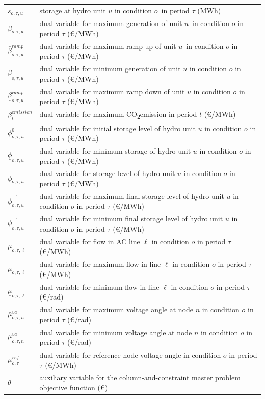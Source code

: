 \documentclass[final]{IEEEtran}
\newcommand{\COtwo}{CO\textsubscript{2}\;}
\begin{document}
\begin{supertabular}{p{1.5cm} p{6.5cm}}
	$s_{o, \tau, u}$ 						& storage at hydro unit $u$ in condition $o$ in period $\tau$ (MWh) \\
	$\bar{\beta}_{o, \tau, u}$ & dual variable for maximum generation of unit $u$ in condition $o$ in period $\tau$ (€/MWh) \\
	$\bar{\beta}_{o, \tau, u}^{ramp}$ & dual variable for maximum ramp up of unit $u$ in condition $o$ in period $\tau$ (€/MWh) \\
	$\underline{\beta}_{o, \tau, u}$ & dual variable for minimum generation of unit $u$ in condition $o$ in period $\tau$ (€/MWh) \\
	$\underline{\beta}_{o, \tau, u}^{ramp}$	& dual variable for maximum ramp down of unit $u$ in condition $o$ in period $\tau$ (€/MWh) \\
	$\beta_{t}^{emission}$ & dual variable for maximum \COtwo emission in period $t$ (€/MWh) \\
	$\phi_{o, \tau, u}^{0}$ & dual variable for initial storage level of hydro unit $u$ in condition $o$ in period $\tau$ (€/MWh) \\
	$\underline{\phi}_{o, \tau, u}$ & dual variable for minimum storage of hydro unit $u$ in condition $o$ in period $\tau$ (€/MWh) \\
	$\phi_{o, \tau, u}$ & dual variable for storage level of hydro unit $u$ in condition $o$ in period $\tau$ (€/MWh) \\
	$\bar{\phi}_{o, \tau, u}^{-1}$ & dual variable for maximum final storage level of hydro unit $u$ in condition $o$ in period $\tau$ (€/MWh) \\
	$\underline{\phi}_{o, \tau, u}^{-1}$ & dual variable for minimum final storage level of hydro unit $u$ in condition $o$ in period $\tau$ (€/MWh) \\
	$\mu_{o, \tau, \ell}$ 	& dual variable for flow in AC line $\ell$ in condition $o$ in period $\tau$ (€/MWh) \\
	$\bar{\mu}_{o, \tau, \ell}$	& dual variable for maximum flow in line $\ell$ in condition $o$ in period $\tau$ (€/MWh) \\
	$\underline{\mu}_{o, \tau, \ell}$ & dual variable for minimum flow in line $\ell$ in condition $o$ in period $\tau$ (€/rad) \\
	$\bar{\mu}^{va}_{o, \tau, n}$ & dual variable for maximum voltage angle at node $n$ in condition $o$ in period $\tau$ (€/rad) \\
	$\underline{\mu}^{va}_{o, \tau, n}$ & dual variable for minimum voltage angle at node $n$ in condition $o$ in period $\tau$ (€/rad) \\
	$\mu^{ref}_{o, \tau}$ & dual variable for reference node voltage angle in condition $o$ in period $\tau$ (€/MWh) \\
	$\theta$ 	& auxiliary variable for the column-and-constraint master problem objective function (€)
\end{supertabular}
\end{document}

